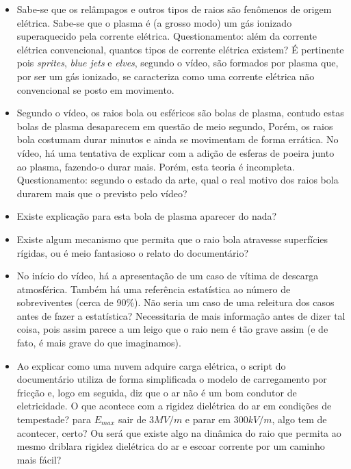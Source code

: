 \documentclass[a4paper, 12pt, onecolumn,singlespacing]{article}
\begin{document}
	\begin{itemize}
		\item Sabe-se que os relâmpagos e outros tipos de raios são fenômenos de origem elétrica. Sabe-se que o plasma é (a grosso modo) um gás ionizado superaquecido pela corrente elétrica. Questionamento: além da corrente elétrica convencional, quantos tipos de corrente elétrica existem? É pertinente pois \textit{sprites}, \textit{blue jets} e \textit{elves}, segundo o vídeo, são formados por plasma que, por ser um gás ionizado, se caracteriza como uma corrente elétrica não convencional se posto em movimento.
	
		\item Segundo o vídeo, os raios bola ou esféricos são bolas de plasma, contudo estas bolas de plasma desaparecem em questão de meio segundo, Porém, os raios bola costumam durar minutos e ainda se movimentam de forma errática. No vídeo, há uma tentativa de explicar com a adição de esferas de poeira junto ao plasma, fazendo-o durar mais. Porém, esta teoria é incompleta. Questionamento: segundo o estado da arte, qual o real motivo dos raios bola durarem mais que o previsto pelo vídeo?
		
		\item Existe explicação para esta bola de plasma aparecer do nada?
		
		\item Existe algum mecanismo que permita que o raio bola atravesse superfícies rígidas, ou é meio fantasioso o relato do documentário?
	
		\item No início do vídeo, há a apresentação de um caso de vítima de descarga atmosférica. Também há uma referência estatística ao número de sobreviventes (cerca de 90\%). Não seria um caso de uma releitura dos casos antes de fazer a estatística? Necessitaria de mais informação antes de dizer tal coisa, pois assim parece a um leigo que o raio nem é tão grave assim (e de fato, é mais grave do que imaginamos).
		
		\item Ao explicar como uma nuvem adquire carga elétrica, o script do documentário utiliza de forma simplificada o modelo de carregamento por fricção e, logo em seguida, diz que o ar não é um bom condutor de eletricidade. O que acontece com a rigidez dielétrica do ar em condições de tempestade? para $E_{max}$ sair de $3MV/m$ e parar em $300kV/m$, algo tem de acontecer, certo? Ou será que existe algo na dinâmica do raio que permita ao mesmo driblara rigidez dielétrica do ar e escoar corrente por um caminho mais fácil?
		
	\end{itemize}
	
\end{document}
